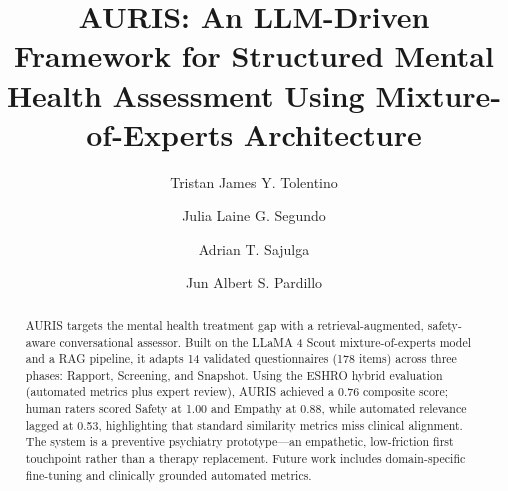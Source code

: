 \documentclass{svproc}
\begin{document}
\mainmatter

\pagestyle{empty}

\title{AURIS: An LLM-Driven Framework for Structured Mental Health Assessment Using Mixture-of-Experts Architecture}

\author{Tristan James Y. Tolentino \and Julia Laine G. Segundo \and Adrian T. Sajulga \and Jun Albert S. Pardillo}


\maketitle

\begin{abstract}
AURIS targets the mental health treatment gap with a retrieval-augmented, safety-aware conversational assessor. Built on the LLaMA 4 Scout mixture-of-experts model and a RAG pipeline, it adapts 14 validated questionnaires (178 items) across three phases: Rapport, Screening, and Snapshot. Using the ESHRO hybrid evaluation (automated metrics plus expert review), AURIS achieved a 0.76 composite score; human raters scored Safety at 1.00 and Empathy at 0.88, while automated relevance lagged at 0.53, highlighting that standard similarity metrics miss clinical alignment. The system is a preventive psychiatry prototype---an empathetic, low-friction first touchpoint rather than a therapy replacement. Future work includes domain-specific fine-tuning and clinically grounded automated metrics.
\end{abstract}
\end{document}
